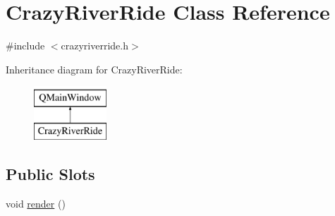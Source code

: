 \hypertarget{class_crazy_river_ride}{\section{Crazy\-River\-Ride Class Reference}
\label{class_crazy_river_ride}
}


{\ttfamily \#include $<$crazyriverride.\-h$>$}

Inheritance diagram for Crazy\-River\-Ride\-:\begin{figure}[H]
\begin{center}
\leavevmode
\includegraphics[height=2.000000cm]{class_crazy_river_ride}
\end{center}
\end{figure}
\subsection*{Public Slots}
\begin{DoxyCompactItemize}
\item 
void \hyperlink{class_crazy_river_ride_a723a8b3355778a13d7d1e3a3e45d30a0}{render} ()
\end{DoxyCompactItemize}
